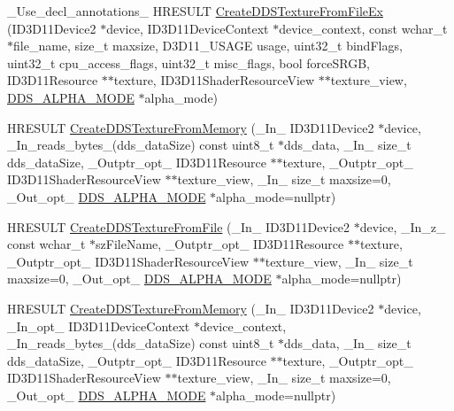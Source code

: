 \begin{DoxyCompactItemize}
\item 
\+\_\+\+Use\+\_\+decl\+\_\+annotations\+\_\+ H\+R\+E\+S\+U\+LT \hyperlink{namespacemage_a098c27d7fa0aa4437d4a878c7eb75792}{Create\+D\+D\+S\+Texture\+From\+File\+Ex} (I\+D3\+D11\+Device2 $\ast$device, I\+D3\+D11\+Device\+Context $\ast$device\+\_\+context, const wchar\+\_\+t $\ast$file\+\_\+name, size\+\_\+t maxsize, D3\+D11\+\_\+\+U\+S\+A\+GE usage, uint32\+\_\+t bind\+Flags, uint32\+\_\+t cpu\+\_\+access\+\_\+flags, uint32\+\_\+t misc\+\_\+flags, bool force\+S\+R\+GB, I\+D3\+D11\+Resource $\ast$$\ast$texture, I\+D3\+D11\+Shader\+Resource\+View $\ast$$\ast$texture\+\_\+view, \hyperlink{namespacemage_a0c586a2bad862f4858900ca121ca80c2}{D\+D\+S\+\_\+\+A\+L\+P\+H\+A\+\_\+\+M\+O\+DE} $\ast$alpha\+\_\+mode)
\item 
H\+R\+E\+S\+U\+LT \hyperlink{namespacemage_ae694dfc6b3a2c61338a346041f223306}{Create\+D\+D\+S\+Texture\+From\+Memory} (\+\_\+\+In\+\_\+ I\+D3\+D11\+Device2 $\ast$device, \+\_\+\+In\+\_\+reads\+\_\+bytes\+\_\+(dds\+\_\+data\+Size) const uint8\+\_\+t $\ast$dds\+\_\+data, \+\_\+\+In\+\_\+ size\+\_\+t dds\+\_\+data\+Size, \+\_\+\+Outptr\+\_\+opt\+\_\+ I\+D3\+D11\+Resource $\ast$$\ast$texture, \+\_\+\+Outptr\+\_\+opt\+\_\+ I\+D3\+D11\+Shader\+Resource\+View $\ast$$\ast$texture\+\_\+view, \+\_\+\+In\+\_\+ size\+\_\+t maxsize=0, \+\_\+\+Out\+\_\+opt\+\_\+ \hyperlink{namespacemage_a0c586a2bad862f4858900ca121ca80c2}{D\+D\+S\+\_\+\+A\+L\+P\+H\+A\+\_\+\+M\+O\+DE} $\ast$alpha\+\_\+mode=nullptr)
\item 
H\+R\+E\+S\+U\+LT \hyperlink{namespacemage_a9ebb3d4391bb4b5b1393fc1efce57d8e}{Create\+D\+D\+S\+Texture\+From\+File} (\+\_\+\+In\+\_\+ I\+D3\+D11\+Device2 $\ast$device, \+\_\+\+In\+\_\+z\+\_\+ const wchar\+\_\+t $\ast$sz\+File\+Name, \+\_\+\+Outptr\+\_\+opt\+\_\+ I\+D3\+D11\+Resource $\ast$$\ast$texture, \+\_\+\+Outptr\+\_\+opt\+\_\+ I\+D3\+D11\+Shader\+Resource\+View $\ast$$\ast$texture\+\_\+view, \+\_\+\+In\+\_\+ size\+\_\+t maxsize=0, \+\_\+\+Out\+\_\+opt\+\_\+ \hyperlink{namespacemage_a0c586a2bad862f4858900ca121ca80c2}{D\+D\+S\+\_\+\+A\+L\+P\+H\+A\+\_\+\+M\+O\+DE} $\ast$alpha\+\_\+mode=nullptr)
\item 
H\+R\+E\+S\+U\+LT \hyperlink{namespacemage_a0f7b5b2cc18c9d007e91397ac7916aad}{Create\+D\+D\+S\+Texture\+From\+Memory} (\+\_\+\+In\+\_\+ I\+D3\+D11\+Device2 $\ast$device, \+\_\+\+In\+\_\+opt\+\_\+ I\+D3\+D11\+Device\+Context $\ast$device\+\_\+context, \+\_\+\+In\+\_\+reads\+\_\+bytes\+\_\+(dds\+\_\+data\+Size) const uint8\+\_\+t $\ast$dds\+\_\+data, \+\_\+\+In\+\_\+ size\+\_\+t dds\+\_\+data\+Size, \+\_\+\+Outptr\+\_\+opt\+\_\+ I\+D3\+D11\+Resource $\ast$$\ast$texture, \+\_\+\+Outptr\+\_\+opt\+\_\+ I\+D3\+D11\+Shader\+Resource\+View $\ast$$\ast$texture\+\_\+view, \+\_\+\+In\+\_\+ size\+\_\+t maxsize=0, \+\_\+\+Out\+\_\+opt\+\_\+ \hyperlink{namespacemage_a0c586a2bad862f4858900ca121ca80c2}{D\+D\+S\+\_\+\+A\+L\+P\+H\+A\+\_\+\+M\+O\+DE} $\ast$alpha\+\_\+mode=nullptr)

\end{DoxyCompactItemize}
